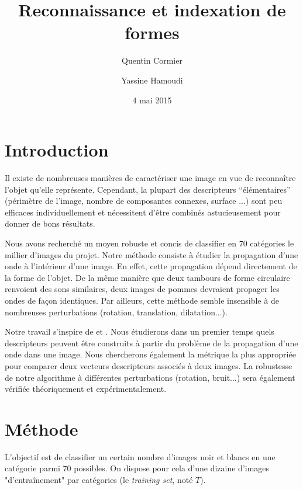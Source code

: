 \documentclass[a4paper,10pt]{article} %
\title{Reconnaissance et indexation de formes}
\author{Quentin Cormier \and Yassine Hamoudi}
\date{4 mai 2015}
\theoremstyle{definition} %
\begin{document}
\maketitle

\tableofcontents


\section{Introduction}

Il existe de nombreuses manières de caractériser une image en vue de reconnaître l'objet qu'elle représente. Cependant, la plupart des descripteurs ``élémentaires'' (périmètre de l'image, nombre de composantes connexes, surface ...) sont peu efficaces individuellement et nécessitent d'être combinés astucieusement pour donner de bons résultats.

Nous avons recherché un moyen robuste et concis de classifier en 70 catégories le millier d'images du projet. Notre méthode consiste à étudier la propagation d'une onde à l'intérieur d'une image. En effet, cette propagation dépend directement de la forme de l'objet. De la même manière que deux tambours de forme circulaire renvoient des sons similaires, deux images de pommes devraient propager les ondes de façon identiques. Par ailleurs, cette méthode semble insensible à de nombreuses perturbations (rotation, translation, dilatation...).

Notre travail s'inspire de \cite{Zuliani04} et \cite{KhabouHR07}. Nous étudierons dans un premier temps quels descripteurs peuvent être construits à partir du problème de la propagation d'une onde dans une image. Nous chercherons également la métrique la plus appropriée pour comparer deux vecteurs descripteurs associés à deux images. La robustesse de notre algorithme à différentes perturbations (rotation, bruit...) sera également vérifiée théoriquement et expérimentalement.

\section{Méthode}

L'objectif est de classifier un certain nombre d'images noir et blancs en une catégorie parmi 70 possibles.
On dispose pour cela d'une dizaine d'images "d'entraînement" par catégories (le \textit{training set}, noté $T$).
\end{document}

